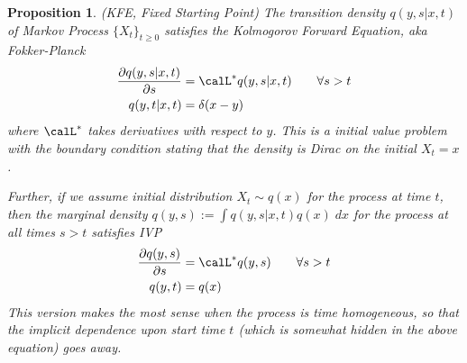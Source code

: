 \documentclass[12pt]{article}
\theoremstyle{plain}
\newtheorem{prop}[thm]{Proposition}
\theoremstyle{definition}
\theoremstyle{remark}
\begin{document}
\begin{prop}
\emph{(KFE, Fixed Starting Point)}
The transition density $q(y,s|x,t)$ of Markov Process
$\{X_t\}_{t\geq 0}$ satisfies the \emph{Kolmogorov Forward Equation},
aka \emph{Fokker-Planck}
\begin{align*}
  \frac{\partial q(y,s|x,t)}{\partial s}
  &=
  \calL^* q(y,s|x,t)
  \qquad
  \forall s>t
  \\
  q(y,t|x,t)
  &= \delta(x-y)
\end{align*}
where $\calL^*$ takes derivatives with respect to $y$.
This is a initial value problem with the boundary condition stating that
the density is Dirac on the initial $X_t=x$.

Further, if we assume initial distribution $X_t\sim q(x)$ for the
process at time $t$, then the marginal density
$q(y,s):=\int q(y,s|x,t)q(x)\;dx$ for the process
at all times $s>t$ satisfies IVP
\begin{align*}
  \frac{\partial q(y,s)}{\partial s}
  &=
  \calL^* q(y,s)
  \qquad
  \forall s>t
  \\
  q(y,t)
  &= q(x)
\end{align*}
This version makes the most sense when the process is time homogeneous,
so that the implicit dependence upon start time $t$ (which is
somewhat hidden in the above equation) goes away.
\end{prop}
\end{document}
